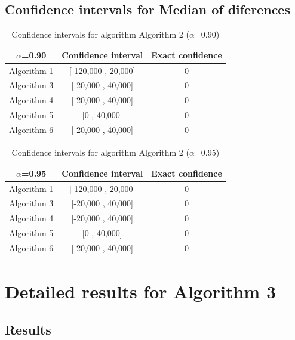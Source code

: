 \documentclass[a4paper,10pt]{article}
\begin{document}
\subsection{Confidence intervals for Median of diferences}

\begin{table}[!htp]
\centering\small
\begin{tabular}{
|c|c|c|}
\hline
 $\alpha$=0.90 & Confidence interval & Exact confidence \\ \hline 
Algorithm 1 & [-120,000 , 20,000] & 0\\ \hline 
Algorithm 3 & [-20,000 , 40,000] & 0\\ \hline 
Algorithm 4 & [-20,000 , 40,000] & 0\\ \hline 
Algorithm 5 & [0 , 40,000] & 0\\ \hline 
Algorithm 6 & [-20,000 , 40,000] & 0\\ \hline 

\end{tabular}
\caption{Confidence intervals for algorithm Algorithm 2 ($\alpha$=0.90)}
\end{table}
\begin{table}[!htp]
\centering\small
\begin{tabular}{
|c|c|c|}
\hline
 $\alpha$=0.95 & Confidence interval & Exact confidence \\ \hline 
Algorithm 1 & [-120,000 , 20,000] & 0\\ \hline 
Algorithm 3 & [-20,000 , 40,000] & 0\\ \hline 
Algorithm 4 & [-20,000 , 40,000] & 0\\ \hline 
Algorithm 5 & [0 , 40,000] & 0\\ \hline 
Algorithm 6 & [-20,000 , 40,000] & 0\\ \hline 

\end{tabular}
\caption{Confidence intervals for algorithm Algorithm 2 ($\alpha$=0.95)}
\end{table}

 \clearpage 


\section{Detailed results for Algorithm 3}


\subsection{Results}
\end{document}
